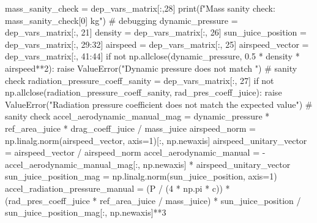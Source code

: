 {}
\markdownRendererSectionEnd \markdownRendererSectionBegin
{}\markdownRendererInterblockSeparator
{}mass_sanity_check = dep_vars_matrix[:,28] print(f"Mass sanity check: {mass_sanity_check[0]} kg") # debugging\markdownRendererInterblockSeparator
{}
\markdownRendererSectionEnd \markdownRendererSectionBegin
{}\markdownRendererInterblockSeparator
{}
\markdownRendererSectionEnd \markdownRendererSectionBegin
{}\markdownRendererInterblockSeparator
{}dynamic_pressure = dep_vars_matrix[:, 21] density = dep_vars_matrix[:, 26] sun_juice_position = dep_vars_matrix[:, 29:32] airspeed = dep_vars_matrix[:, 25] airspeed_vector = dep_vars_matrix[:, 41:44]\markdownRendererInterblockSeparator
{}
\markdownRendererSectionEnd \markdownRendererSectionBegin
{}\markdownRendererInterblockSeparator
{}if not np.allclose(dynamic_pressure, 0.5 * density * airspeed**2): raise ValueError("Dynamic pressure does not match ") # sanity check radiation_pressure_coeff_sanity = dep_vars_matrix[:, 27] if not np.allclose(radiation_pressure_coeff_sanity, rad_pres_coeff_juice): raise ValueError("Radiation pressure coefficient does not match the expected value") # sanity check\markdownRendererInterblockSeparator
{}
\markdownRendererSectionEnd \markdownRendererSectionBegin
{}\markdownRendererInterblockSeparator
{}accel_aerodynamic_manual_mag = dynamic_pressure * ref_area_juice * drag_coeff_juice / mass_juice airspeed_norm = np.linalg.norm(airspeed_vector, axis=1)[:, np.newaxis] airspeed_unitary_vector = airspeed_vector / airspeed_norm accel_aerodynamic_manual = -accel_aerodynamic_manual_mag[:, np.newaxis] * airspeed_unitary_vector sun_juice_position_mag = np.linalg.norm(sun_juice_position, axis=1)\markdownRendererInterblockSeparator
{}
\markdownRendererSectionEnd \markdownRendererSectionBegin
{}\markdownRendererInterblockSeparator
{}accel_radiation_pressure_manual = (P / (4 * np.pi * c)) * (rad_pres_coeff_juice * ref_area_juice / mass_juice) * sun_juice_position / sun_juice_position_mag[:, np.newaxis]**3\markdownRendererInterblockSeparator
{}
\markdownRendererSectionEnd \markdownRendererSectionBegin
{}\markdownRendererInterblockSeparator
